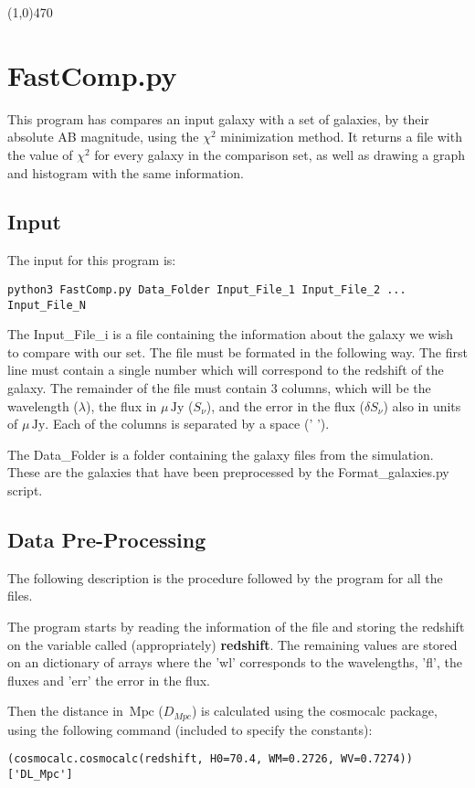 \documentclass[11pt]{report}
\newcommand{\unit}[1]{\ensuremath{\, \mathrm{#1}}}
\newcommand{\horline}{\begin{center} \line(1,0){470} \end{center}}
\begin{document}
\horline 

\section{FastComp.py}

This program has compares an input galaxy with a set of galaxies, by their absolute AB magnitude, using the $\chi^2$ minimization method. It returns a file with the value of $\chi^2$ for every galaxy in the comparison set, as well as drawing a graph and histogram with the same information.

\subsection{Input}

The input for this program is:
\begin{verbatim}
python3 FastComp.py Data_Folder Input_File_1 Input_File_2 ... Input_File_N
\end{verbatim}

The Input\_File\_i is a file containing the information about the galaxy we wish to compare with our set. The file must be formated in the following way. The first line must contain a single number which will correspond to the redshift of the galaxy. The remainder of the file must contain 3 columns, which will be the wavelength ($\lambda$), the flux in $\mu \unit{Jy}$ ($S_\nu$), and the error in the flux ($\delta S_\nu$) also in units of $\mu \unit{Jy}$.
Each of the columns is separated by a space (' ').

The Data\_Folder is a folder containing the galaxy files from the simulation. These are the galaxies that have been preprocessed by the Format\_galaxies.py script.

\subsection{Data Pre-Processing}

The following description is the procedure followed by the program for all the files.

The program starts by reading the information of the file and storing the redshift on the variable called (appropriately) {\bf redshift}. The remaining values are stored on an dictionary of arrays where the 'wl' corresponds to the wavelengths, 'fl', the fluxes and 'err' the error in the flux.

Then the distance in $\unit{Mpc}$ ($D_{Mpc}$) is calculated using the cosmocalc package, using the following command (included to specify the constants):
\begin{verbatim}
(cosmocalc.cosmocalc(redshift, H0=70.4, WM=0.2726, WV=0.7274))['DL_Mpc']
\end{verbatim}
\end{document}
